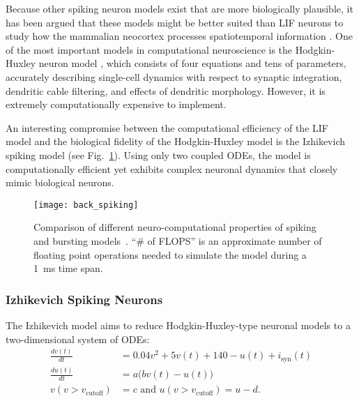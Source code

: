Because other spiking neuron models exist that are more biologically plausible,
it has been argued that these models might be better suited 
than \ac{LIF} neurons to study how the mammalian neocortex processes
spatiotemporal information \citep{Izhikevich2004a}.
One of the most important models in computational neuroscience is the
Hodgkin-Huxley neuron model \citep{HodgkinHuxley1954}, 
which consists of four equations and tens of parameters,
accurately describing single-cell dynamics 
with respect to synaptic integration,
dendritic cable filtering, and effects of dendritic morphology.
However, it is extremely computationally expensive to implement.

An interesting compromise between the computational efficiency of the \ac{LIF}
model and the biological fidelity of the Hodgkin-Huxley model is the
Izhikevich spiking model \citep{Izhikevich2003} 
(see Fig.~\ref{fig:BKG|spikingModels}).
Using only two coupled \acp{ODE}, the model is computationally efficient 
yet exhibits complex neuronal dynamics that closely mimic biological neurons.

\begin{figure}[t]
  \centering
  \texttt{[image: back\_spiking]}
  \caption{
  Comparison of different neuro-computational properties of spiking and
  bursting models~\citep{Izhikevich2004a}.
  ``\# of FLOPS'' is an approximate number of floating point operations
  needed to simulate the model during a \SI{1}{\milli\second} time span.}
  \label{fig:BKG|spikingModels}
\end{figure}


\subsubsection{Izhikevich Spiking Neurons}
\label{sec:BKG|Izh}

The Izhikevich model aims to reduce
Hodgkin-Huxley-type neuronal models to a two-dimensional
system of \acp{ODE}:
\begin{align}
\frac{dv(t)}{dt} & = 0.04v^2+5v(t)+140-u(t)+i_{\textrm{syn}}(t) 
	\label{eqn:BKG|Izh|IzhVoltage} \\
\frac{du(t)}{dt} & = a \big(b v(t) - u(t)\big) 
	\label{eqn:BKG|Izh|IzhRecovery} \\
v(v>v_{\textrm{cutoff}}) & = c 
	\textrm{   and   } u(v>v_{\textrm{cutoff}}) = u-d.
	\label{eqn:BKG|Izh|IzhReset}
\end{align}

